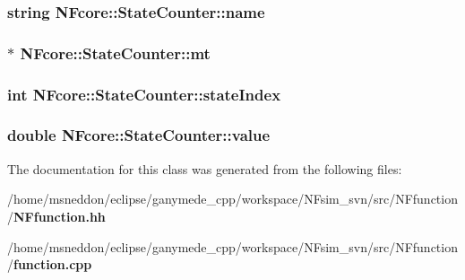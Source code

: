 \subsubsection{\setlength{\rightskip}{0pt plus 5cm}string {\bf NFcore::StateCounter::name}}\label{classNFcore_1_1StateCounter_f33e6c1ac6e69d74b24f6b9ca3238193}


\subsubsection{$\ast$ {\bf NFcore::StateCounter::mt}}\label{classNFcore_1_1StateCounter_415dd923cb75e9da42f3f5ca44bcee49}


\subsubsection{\setlength{\rightskip}{0pt plus 5cm}int {\bf NFcore::StateCounter::stateIndex}}\label{classNFcore_1_1StateCounter_0b039d4ee92aae9dd6b841f8cea13cd3}


\subsubsection{\setlength{\rightskip}{0pt plus 5cm}double {\bf NFcore::StateCounter::value}}\label{classNFcore_1_1StateCounter_c170ba269add82d4722bc386b3532bdb}




The documentation for this class was generated from the following files:\begin{CompactItemize}
\item 
/home/msneddon/eclipse/ganymede\_\-cpp/workspace/NFsim\_\-svn/src/NFfunction/{\bf NFfunction.hh}\item 
/home/msneddon/eclipse/ganymede\_\-cpp/workspace/NFsim\_\-svn/src/NFfunction/{\bf function.cpp}\end{CompactItemize}
